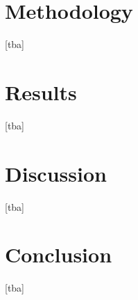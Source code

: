 \documentclass[a4paper, 11pt]{article}
\begin{document}
\section{Methodology}
[tba]


\section{Results}
[tba]


\section{Discussion}
[tba]


\section{Conclusion}
[tba]
\end{document}
